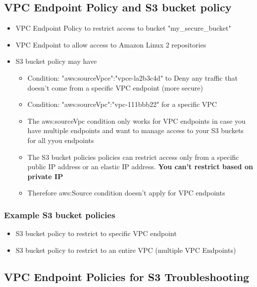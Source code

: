 \subsection{VPC Endpoint Policy and S3 bucket policy}
\begin{itemize}
    \item VPC Endpoint Policy to restrict access to bucket "my_secure_bucket"

    \item VPC Endpoint to allow access to Amazon Linux 2 repositories

    \item S3 bucket policy may have
    \begin{itemize}
        \item Condition: "aws:sourceVpce":"vpce-la2b3c4d" to Deny any traffic that doesn't come from a specific VPC endpoint (more secure)
        \item Condition: "aws:sourceVpc":"vpc-111bbb22" for a specific VPC
        \item The aws:sourceVpc condition only works for VPC endpoints in case you have multiple endpoints and want to manage access to your S3 buckets for all yyou endpoints
        \item The S3 bucket policies policies can restrict access only from a specific public IP address or an elastic IP address. \textbf{You can't restrict based on private IP}
        \item Therefore aws:Source condition doesn't apply for VPC endpoints
    \end{itemize}
\end{itemize}

\subsubsection{Example S3 bucket policies}
\begin{itemize}
    \item S3 bucket policy to restrict to specific VPC endpoint
    \item S3 bucket policy to restrict to an entire VPC (multiple VPC Endpoints)
\end{itemize}

\subsection{VPC Endpoint Policies for S3 Troubleshooting}


